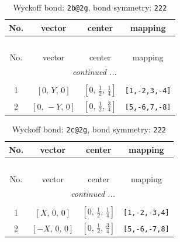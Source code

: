 \documentclass[fleqn,8pt]{jsarticle}
\begin{document}
\renewcommand{\arraystretch}{1.2}
\begin{longtable}{cccc}
\caption{Wyckoff bond: {\tt 2b@2g}, bond symmetry: {\tt 222}}
 \\
 \hline \hline
No. & vector & center & mapping \\ \hline \endfirsthead

\multicolumn{3}{l}{\tablename\ \thetable{}} \\
 \hline \hline
No. & vector & center & mapping \\ \hline \endhead

 \hline \hline
\multicolumn{3}{r}{\footnotesize\it continued ...} \\ \endfoot

 \hline \hline
\multicolumn{3}{r}{} \\ \endlastfoot

1 & $\left[ 0,\, Y,\, 0 \right]$ & $\left[ 0,\, \frac{1}{2},\, \frac{1}{4} \right]$ & {\tt [1,-2,3,-4]} \\ \hline
2 & $\left[ 0,\, - Y,\, 0 \right]$ & $\left[ 0,\, \frac{1}{2},\, \frac{3}{4} \right]$ & {\tt [5,-6,7,-8]} \\
\end{longtable}
\renewcommand{\arraystretch}{1.2}
\begin{longtable}{cccc}
\caption{Wyckoff bond: {\tt 2c@2g}, bond symmetry: {\tt 222}}
 \\
 \hline \hline
No. & vector & center & mapping \\ \hline \endfirsthead

\multicolumn{3}{l}{\tablename\ \thetable{}} \\
 \hline \hline
No. & vector & center & mapping \\ \hline \endhead

 \hline \hline
\multicolumn{3}{r}{\footnotesize\it continued ...} \\ \endfoot

 \hline \hline
\multicolumn{3}{r}{} \\ \endlastfoot

1 & $\left[ X,\, 0,\, 0 \right]$ & $\left[ 0,\, \frac{1}{2},\, \frac{1}{4} \right]$ & {\tt [1,-2,-3,4]} \\ \hline
2 & $\left[ - X,\, 0,\, 0 \right]$ & $\left[ 0,\, \frac{1}{2},\, \frac{3}{4} \right]$ & {\tt [5,-6,-7,8]} \\
\end{longtable}
\renewcommand{\arraystretch}{1.2}
\end{document}
